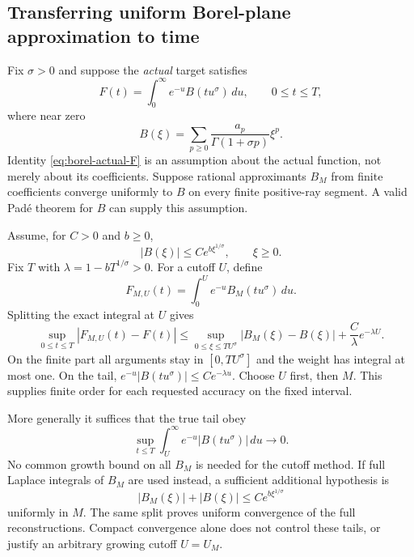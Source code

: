 \subsection{Transferring uniform Borel-plane approximation to time}
\label{app:borel-transfer}

Fix $\sigma>0$ and suppose the \emph{actual} target satisfies
\begin{equation}
 F(t)=\int_0^\infty e^{-u}B(tu^\sigma)\,du,\qquad 0\le t\le T,
 \label{eq:borel-actual-F}
\end{equation}
where near zero
\[
 B(\xi)=\sum_{p\ge0}\frac{a_p}{\Gamma(1+\sigma p)}\xi^p.
\]
Identity \eqref{eq:borel-actual-F} is an assumption about the actual
function, not merely about its coefficients. Suppose rational
approximants $B_M$ from finite coefficients converge uniformly to $B$
on every finite positive-ray segment. A valid Pad\'e theorem for $B$
can supply this assumption.

Assume, for $C>0$ and $b\ge0$,
\[
 |B(\xi)|\le C e^{b\xi^{1/\sigma}},\qquad \xi\ge0.
\]
Fix $T$ with $\lambda=1-bT^{1/\sigma}>0$. For a cutoff $U$, define
\[
 F_{M,U}(t)=\int_0^U e^{-u}B_M(tu^\sigma)\,du.
\]
Splitting the exact integral at $U$ gives
\begin{equation}
 \sup_{0\le t\le T}|F_{M,U}(t)-F(t)|
 \le \sup_{0\le\xi\le TU^\sigma}|B_M(\xi)-B(\xi)|
       +\frac C\lambda e^{-\lambda U}.
 \label{eq:borel-cutoff}
\end{equation}
On the finite part all arguments stay in $[0,TU^\sigma]$ and the
weight has integral at most one. On the tail,
$e^{-u}|B(tu^\sigma)|\le Ce^{-\lambda u}$. Choose $U$ first, then $M$.
This supplies finite order for each requested accuracy on the fixed interval.

More generally it suffices that the true tail obey
\[
 \sup_{t\le T}\int_U^\infty e^{-u}|B(tu^\sigma)|\,du\longrightarrow0.
\]
No common growth bound on all $B_M$ is needed for the cutoff method.
If full Laplace integrals of $B_M$ are used instead, a sufficient
additional hypothesis is
\[
 |B_M(\xi)|+|B(\xi)|\le C e^{b\xi^{1/\sigma}}
\]
uniformly in $M$. The same split proves uniform convergence of the full
reconstructions. Compact convergence alone does not control these tails,
or justify an arbitrary growing cutoff $U=U_M$.

